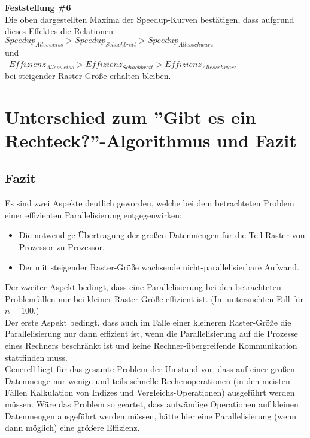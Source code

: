 \documentclass[
10pt, %
a4paper, %
oneside, %
headinclude,footinclude, %
BCOR5mm, %
]{scrartcl}
\begin{document}
\textbf{Feststellung \#6}\\
Die oben dargestellten Maxima der Speedup-Kurven bestätigen, dass aufgrund dieses Effektes die Relationen\\ 
\(Speedup_{Alles weiss} > Speedup_{Schachbrett} > Speedup_{Alles schwarz} \)\\
und\\\
\(Effizienz_{Alles weiss} > Effizienz_{Schachbrett} > Effizienz_{Alles schwarz} \)\\
bei steigender Raster-Größe erhalten bleiben.

\section{Unterschied zum ''Gibt es ein Rechteck?''-Algorithmus und Fazit}

\subsection{Fazit}
Es sind zwei Aspekte deutlich geworden, welche bei dem betrachteten Problem einer effizienten Parallelisierung entgegenwirken:
\begin{itemize}[noitemsep] %
	\item Die notwendige Übertragung der großen Datenmengen für die Teil-Raster von Prozessor zu Prozessor.
	\item Der mit steigender Raster-Größe wachsende nicht-parallelisierbare Aufwand.
\end{itemize}

Der zweiter Aspekt bedingt, dass eine Parallelisierung bei den betrachteten Problemfällen nur bei kleiner Raster-Größe effizient ist. (Im untersuchten Fall für \(n=100\).)\\
Der erste Aspekt bedingt, dass auch im Falle einer kleineren Raster-Größe die Parallelisierung nur dann effizient ist, wenn die Parallelisierung auf die Prozesse eines Rechners beschränkt ist und keine Rechner-übergreifende Kommunikation stattfinden muss.\\

Generell liegt für das gesamte Problem der Umstand vor, dass auf einer großen Datenmenge nur wenige und teils schnelle Rechenoperationen (in den meisten Fällen Kalkulation von Indizes und Vergleichs-Operationen) ausgeführt werden müssen. Wäre das Problem so geartet, dass aufwändige Operationen auf kleinen Datenmengen ausgeführt werden müssen, hätte 
hier eine Parallelisierung (wenn dann möglich) eine größere Effizienz.
\end{document}

